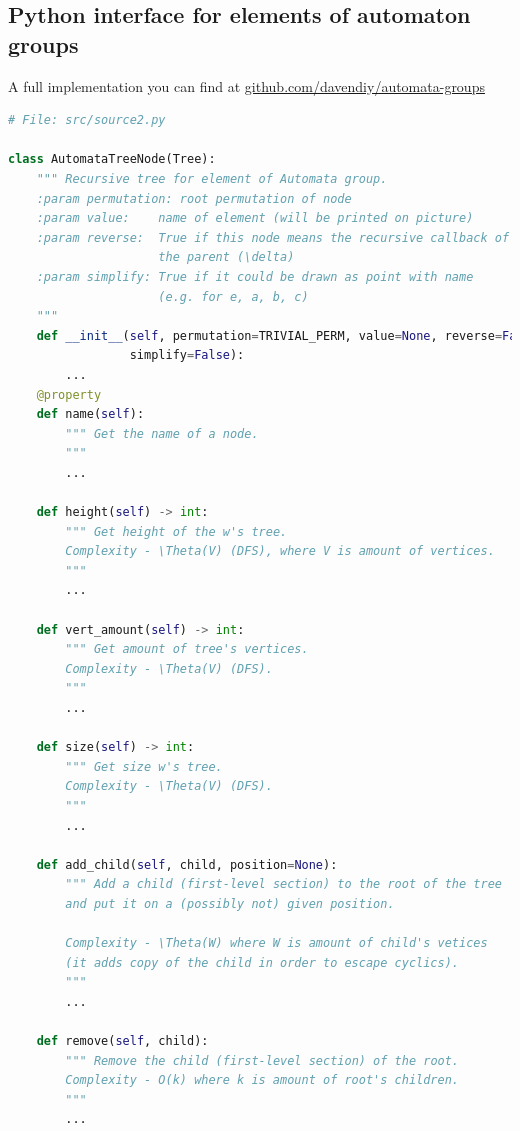 \documentclass[a4paper,12pt]{amsart}
\begin{document}
\begin{appendices}

\section{Python interface for elements of automaton groups}

A full implementation you can find at \href{https://github.com/davendiy/automata-groups}{github.com/davendiy/automata-groups}

\begin{lstlisting}[language=Python, basicstyle=\tiny]
# File: src/source2.py

class AutomataTreeNode(Tree):
    """ Recursive tree for element of Automata group.
    :param permutation: root permutation of node
    :param value:    name of element (will be printed on picture)
    :param reverse:  True if this node means the recursive callback of
                     the parent (\delta)
    :param simplify: True if it could be drawn as point with name
                     (e.g. for e, a, b, c)
    """
    def __init__(self, permutation=TRIVIAL_PERM, value=None, reverse=False,
                 simplify=False):
        ...
    @property
    def name(self):
        """ Get the name of a node.
        """
        ...

    def height(self) -> int:
        """ Get height of the w's tree. 
        Complexity - \Theta(V) (DFS), where V is amount of vertices.
        """
        ...

    def vert_amount(self) -> int:
        """ Get amount of tree's vertices. 
        Complexity - \Theta(V) (DFS).
        """
        ...

    def size(self) -> int:
        """ Get size w's tree. 
        Complexity - \Theta(V) (DFS).
        """
        ...
	
    def add_child(self, child, position=None):
        """ Add a child (first-level section) to the root of the tree 
        and put it on a (possibly not) given position.

        Complexity - \Theta(W) where W is amount of child's vetices 
        (it adds copy of the child in order to escape cyclics).
        """
        ...
        
    def remove(self, child):
        """ Remove the child (first-level section) of the root.
        Complexity - O(k) where k is amount of root's children.
        """
        ...
	
\end{lstlisting}


\end{appendices}
\end{document}
